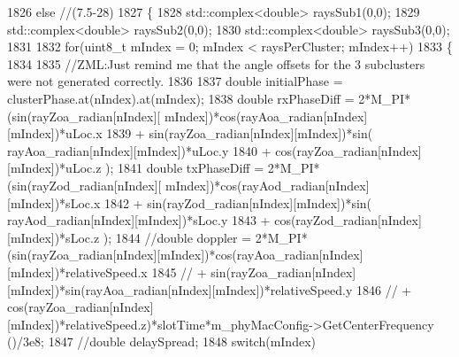 \begin{DoxyCode}
1826                                 \textcolor{keywordflow}{else} \textcolor{comment}{//(7.5-28)}
1827                                 \{
1828                                         std::complex<double> raysSub1(0,0);
1829                                         std::complex<double> raysSub2(0,0);
1830                                         std::complex<double> raysSub3(0,0);
1831 
1832                                         \textcolor{keywordflow}{for}(uint8\_t mIndex = 0; mIndex < raysPerCluster; mIndex++)
1833                                         \{
1834 
1835                                                 \textcolor{comment}{//ZML:Just remind me that the angle offsets for the 3
       subclusters were not generated correctly.}
1836 
1837                                                 \textcolor{keywordtype}{double} initialPhase = clusterPhase.at(nIndex).at(mIndex);
1838                                                 \textcolor{keywordtype}{double} rxPhaseDiff = 2*M\_PI*(sin(rayZoa\_radian[nIndex][
      mIndex])*cos(rayAoa\_radian[nIndex][mIndex])*uLoc.x
1839                                                                 + sin(rayZoa\_radian[nIndex][mIndex])*sin(
      rayAoa\_radian[nIndex][mIndex])*uLoc.y
1840                                                                 + cos(rayZoa\_radian[nIndex][mIndex])*uLoc.z
      );
1841                                                 \textcolor{keywordtype}{double} txPhaseDiff = 2*M\_PI*(sin(rayZod\_radian[nIndex][
      mIndex])*cos(rayAod\_radian[nIndex][mIndex])*sLoc.x
1842                                                                 + sin(rayZod\_radian[nIndex][mIndex])*sin(
      rayAod\_radian[nIndex][mIndex])*sLoc.y
1843                                                                 + cos(rayZod\_radian[nIndex][mIndex])*sLoc.z
      );
1844                                                 \textcolor{comment}{//double doppler =
       2*M\_PI*(sin(rayZoa\_radian[nIndex][mIndex])*cos(rayAoa\_radian[nIndex][mIndex])*relativeSpeed.x}
1845                                                 \textcolor{comment}{//              +
       sin(rayZoa\_radian[nIndex][mIndex])*sin(rayAoa\_radian[nIndex][mIndex])*relativeSpeed.y}
1846                                                 \textcolor{comment}{//              +
       cos(rayZoa\_radian[nIndex][mIndex])*relativeSpeed.z)*slotTime*m\_phyMacConfig->GetCenterFrequency ()/3e8;}
1847                                                 \textcolor{comment}{//double delaySpread;}
1848                                                 \textcolor{keywordflow}{switch}(mIndex)

\end{DoxyCode}
